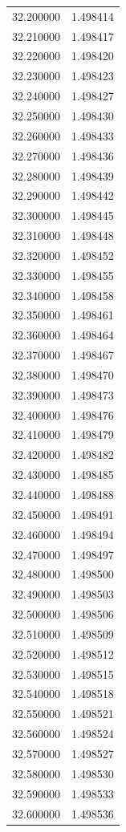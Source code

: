 \begin{tabular}{rr}
32.200000 & 1.498414 \\
32.210000 & 1.498417 \\
32.220000 & 1.498420 \\
32.230000 & 1.498423 \\
32.240000 & 1.498427 \\
32.250000 & 1.498430 \\
32.260000 & 1.498433 \\
32.270000 & 1.498436 \\
32.280000 & 1.498439 \\
32.290000 & 1.498442 \\
32.300000 & 1.498445 \\
32.310000 & 1.498448 \\
32.320000 & 1.498452 \\
32.330000 & 1.498455 \\
32.340000 & 1.498458 \\
32.350000 & 1.498461 \\
32.360000 & 1.498464 \\
32.370000 & 1.498467 \\
32.380000 & 1.498470 \\
32.390000 & 1.498473 \\
32.400000 & 1.498476 \\
32.410000 & 1.498479 \\
32.420000 & 1.498482 \\
32.430000 & 1.498485 \\
32.440000 & 1.498488 \\
32.450000 & 1.498491 \\
32.460000 & 1.498494 \\
32.470000 & 1.498497 \\
32.480000 & 1.498500 \\
32.490000 & 1.498503 \\
32.500000 & 1.498506 \\
32.510000 & 1.498509 \\
32.520000 & 1.498512 \\
32.530000 & 1.498515 \\
32.540000 & 1.498518 \\
32.550000 & 1.498521 \\
32.560000 & 1.498524 \\
32.570000 & 1.498527 \\
32.580000 & 1.498530 \\
32.590000 & 1.498533 \\
32.600000 & 1.498536 \\

\end{tabular}
